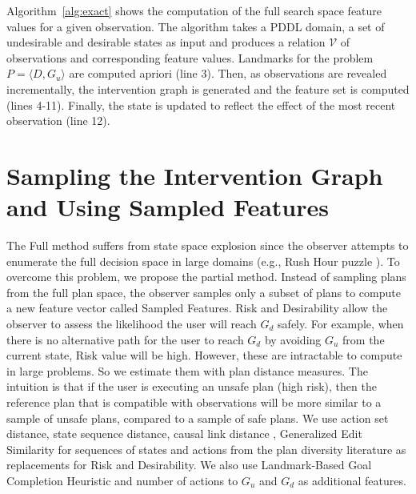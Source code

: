 \documentclass[letterpaper]{article}
\theoremstyle{plain}
\begin{document}
Algorithm~\ref{alg:exact} shows the computation of the full search space feature values for a given observation. The algorithm takes a PDDL domain, a set of undesirable and desirable states as input and produces a relation $\mathcal{V}$ of observations and corresponding feature values. Landmarks for the problem $P = \langle D, G_u\rangle$ are computed apriori (line 3). Then, as observations are revealed incrementally, the intervention graph is generated and the feature set is computed (lines 4-11). Finally, the state is updated to reflect the effect of the most recent observation (line 12).

\section{Sampling the Intervention Graph and Using Sampled Features}
The Full method suffers from state space explosion since the observer attempts to enumerate the full decision space in large domains (e.g., Rush Hour puzzle \cite{fernau2003}). To overcome this problem, we propose the partial method. Instead of sampling plans from the full plan space, the observer samples only a subset of plans to compute a new feature vector called Sampled Features.
Risk and Desirability allow the observer to assess the likelihood the user will reach $G_d$ safely. For example, when there is no alternative path for the user to reach $G_d$ by avoiding $G_u$ from the current state, Risk value will be high. However, these are intractable to compute in large problems. So we estimate them with plan distance measures. The intuition is that if the user is executing an unsafe plan (high risk), then the reference plan that is compatible with observations will be more similar to a sample of unsafe plans, compared to a sample of safe plans. We use action set distance, state sequence distance, causal link distance \cite{nguyen2012generating}, Generalized Edit Similarity for sequences of states and actions \cite{sohrabi2016finding} from the plan diversity literature as replacements for Risk and Desirability. We also use Landmark-Based Goal Completion Heuristic \cite{pereira2017} and number of actions to $G_u$ and $G_d$ as additional features.
\end{document}
